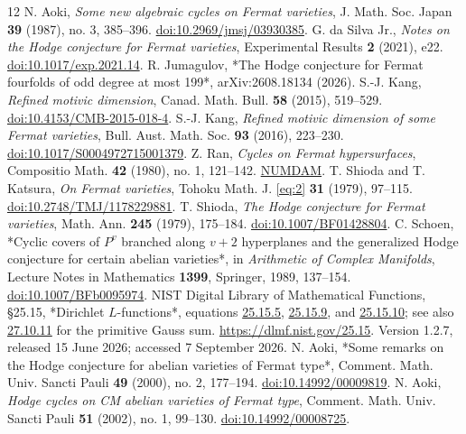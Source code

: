 \documentclass[11pt]{amsart}
\numberwithin{theorem}{section}
\theoremstyle{remark}
\numberwithin{equation}{section}
\begin{document}
\begin{thebibliography}{12}
N. Aoki, \emph{Some new algebraic cycles on Fermat varieties}, J. Math. Soc.
   Japan \textbf{39} (1987), no. 3, 385--396.
   \href{https://doi.org/10.2969/jmsj/03930385}{doi:10.2969/jmsj/03930385}.
G. da Silva Jr., \emph{Notes on the Hodge conjecture for Fermat varieties},
   Experimental Results \textbf{2} (2021), e22.
   \href{https://doi.org/10.1017/exp.2021.14}{doi:10.1017/exp.2021.14}.
R. Jumagulov, *The Hodge conjecture for Fermat fourfolds of odd degree at
   most 199*, arXiv:2608.18134 (2026).
S.-J. Kang, \emph{Refined motivic dimension}, Canad. Math. Bull. \textbf{58} (2015),
   519--529.
   \href{https://doi.org/10.4153/CMB-2015-018-4}{doi:10.4153/CMB-2015-018-4}.
S.-J. Kang, \emph{Refined motivic dimension of some Fermat varieties}, Bull.
   Aust. Math. Soc. \textbf{93} (2016), 223--230.
   \href{https://doi.org/10.1017/S0004972715001379}{doi:10.1017/S0004972715001379}.
Z. Ran, \emph{Cycles on Fermat hypersurfaces}, Compositio Math. \textbf{42} (1980), no. 1,
   121--142.
   \href{https://www.numdam.org/item/CM_1980__42_1_121_0/}{NUMDAM}.
T. Shioda and T. Katsura, \emph{On Fermat varieties}, Tohoku Math. J. \eqref{eq:2}
   \textbf{31} (1979), 97--115.
   \href{https://doi.org/10.2748/TMJ/1178229881}{doi:10.2748/TMJ/1178229881}.
T. Shioda, \emph{The Hodge conjecture for Fermat varieties}, Math. Ann. \textbf{245}
   (1979), 175--184.
   \href{https://doi.org/10.1007/BF01428804}{doi:10.1007/BF01428804}.
C. Schoen, *Cyclic covers of \(P^v\) branched along \(v+2\) hyperplanes
   and the generalized Hodge conjecture for certain abelian varieties*, in
   \emph{Arithmetic of Complex Manifolds}, Lecture Notes in Mathematics \textbf{1399},
   Springer, 1989, 137--154.
   \href{https://doi.org/10.1007/BFb0095974}{doi:10.1007/BFb0095974}.
NIST Digital Library of Mathematical Functions, §25.15, *Dirichlet \(L\)-functions*,
    equations \href{https://dlmf.nist.gov/25.15.E5}{25.15.5},
    \href{https://dlmf.nist.gov/25.15.E9}{25.15.9}, and
    \href{https://dlmf.nist.gov/25.15.E10}{25.15.10}; see also
    \href{https://dlmf.nist.gov/27.10.E11}{27.10.11} for the primitive Gauss sum.
    \href{https://dlmf.nist.gov/25.15}{https://dlmf.nist.gov/25.15}.
    Version 1.2.7, released 15 June 2026; accessed 7 September 2026.
N. Aoki, *Some remarks on the Hodge conjecture for abelian varieties of
    Fermat type*, Comment. Math. Univ. Sancti Pauli \textbf{49} (2000), no. 2,
    177--194.
    \href{https://doi.org/10.14992/00009819}{doi:10.14992/00009819}.
N. Aoki, \emph{Hodge cycles on CM abelian varieties of Fermat type}, Comment.
    Math. Univ. Sancti Pauli \textbf{51} (2002), no. 1, 99--130.
    \href{https://doi.org/10.14992/00008725}{doi:10.14992/00008725}.
\end{thebibliography}
\end{document}
